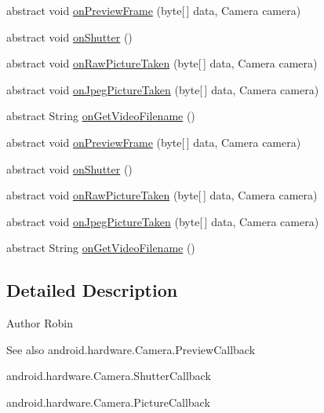 \begin{DoxyCompactItemize}
\item 
abstract void \hyperlink{interfaceswp_1_1tuilmenau_1_1carduinodroid_1_1controller_1_1_camera_callback_af289d167147fc931021807a91936ddf9}{on\+Preview\+Frame} (byte\mbox{[}$\,$\mbox{]} data, Camera camera)
\item 
abstract void \hyperlink{interfaceswp_1_1tuilmenau_1_1carduinodroid_1_1controller_1_1_camera_callback_a30aa84ddd47b4a441246873824bfef48}{on\+Shutter} ()
\item 
abstract void \hyperlink{interfaceswp_1_1tuilmenau_1_1carduinodroid_1_1controller_1_1_camera_callback_aa2ac80b68898674885323f6aaeeaf94c}{on\+Raw\+Picture\+Taken} (byte\mbox{[}$\,$\mbox{]} data, Camera camera)
\item 
abstract void \hyperlink{interfaceswp_1_1tuilmenau_1_1carduinodroid_1_1controller_1_1_camera_callback_a5b358bbeb91e1b5b8e3f1dc2ce9fcd95}{on\+Jpeg\+Picture\+Taken} (byte\mbox{[}$\,$\mbox{]} data, Camera camera)
\item 
abstract String \hyperlink{interfaceswp_1_1tuilmenau_1_1carduinodroid_1_1controller_1_1_camera_callback_a5ca843e916557f8e59378fa7dade887a}{on\+Get\+Video\+Filename} ()
\item 
abstract void \hyperlink{interfaceswp_1_1tuilmenau_1_1carduinodroid_1_1controller_1_1_camera_callback_af289d167147fc931021807a91936ddf9}{on\+Preview\+Frame} (byte\mbox{[}$\,$\mbox{]} data, Camera camera)
\item 
abstract void \hyperlink{interfaceswp_1_1tuilmenau_1_1carduinodroid_1_1controller_1_1_camera_callback_a30aa84ddd47b4a441246873824bfef48}{on\+Shutter} ()
\item 
abstract void \hyperlink{interfaceswp_1_1tuilmenau_1_1carduinodroid_1_1controller_1_1_camera_callback_aa2ac80b68898674885323f6aaeeaf94c}{on\+Raw\+Picture\+Taken} (byte\mbox{[}$\,$\mbox{]} data, Camera camera)
\item 
abstract void \hyperlink{interfaceswp_1_1tuilmenau_1_1carduinodroid_1_1controller_1_1_camera_callback_a5b358bbeb91e1b5b8e3f1dc2ce9fcd95}{on\+Jpeg\+Picture\+Taken} (byte\mbox{[}$\,$\mbox{]} data, Camera camera)
\item 
abstract String \hyperlink{interfaceswp_1_1tuilmenau_1_1carduinodroid_1_1controller_1_1_camera_callback_a5ca843e916557f8e59378fa7dade887a}{on\+Get\+Video\+Filename} ()
\end{DoxyCompactItemize}


\subsection{Detailed Description}
\begin{DoxyAuthor}{Author}
Robin 
\end{DoxyAuthor}
\begin{DoxySeeAlso}{See also}
android.\+hardware.\+Camera.\+Preview\+Callback 

android.\+hardware.\+Camera.\+Shutter\+Callback 

android.\+hardware.\+Camera.\+Picture\+Callback 
\end{DoxySeeAlso}


